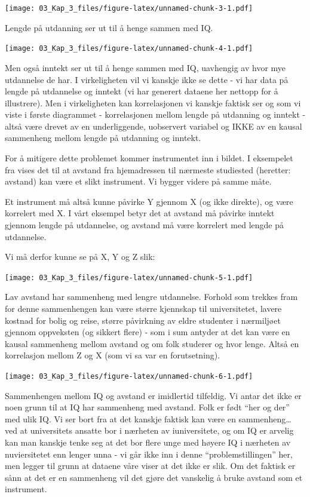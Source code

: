 \documentclass[
]{article}
\begin{document}
\texttt{[image: 03\_Kap\_3\_files/figure-latex/unnamed-chunk-3-1.pdf]}

Lengde på utdanning ser ut til å henge sammen med IQ.

\texttt{[image: 03\_Kap\_3\_files/figure-latex/unnamed-chunk-4-1.pdf]}

Men også inntekt ser ut til å henge sammen med IQ, uavhengig av hvor mye utdannelse de har. I virkeligheten vil vi kanskje ikke se dette - vi har data på lengde på utdannelse og inntekt (vi har generert dataene her nettopp for å illustrere). Men i virkeligheten kan korrelasjonen vi kanskje faktisk ser og som vi viste i første diagrammet - korrelasjonen mellom lengde på utdanning og inntekt - altså være drevet av en underliggende, uobservert variabel og IKKE av en kausal sammenheng mellom lengde på utdanning og inntekt.

For å mitigere dette problemet kommer instrumentet inn i bildet. I eksempelet fra \citet{mastenCausalInferenceBootcamp2015} vises det til at avstand fra hjemadressen til nærmeste studiested (heretter: avstand) kan være et slikt instrument. Vi bygger videre på samme måte.

Et instrument må altså kunne påvirke Y gjennom X (og ikke direkte), og være korrelert med X. I vårt eksempel betyr det at avstand må påvirke inntekt gjennom lengde på utdannelse, og avstand må være korrelert med lengde på utdannelse.

Vi må derfor kunne se på X, Y og Z slik:

\texttt{[image: 03\_Kap\_3\_files/figure-latex/unnamed-chunk-5-1.pdf]}

Lav avstand har sammenheng med lengre utdannelse. Forhold som trekkes fram for denne sammenhengen kan være større kjennskap til universitetet, lavere kostnad for bolig og reise, større påvirkning av eldre studenter i nærmiljøet gjennom oppveksten (og sikkert flere) - som i sum antyder at det kan være en kausal sammenheng mellom avstand og om folk studerer og hvor lenge. Altså en korrelasjon mellom Z og X (som vi sa var en forutsetning).

\texttt{[image: 03\_Kap\_3\_files/figure-latex/unnamed-chunk-6-1.pdf]}

Sammenhengen mellom IQ og avstand er imidlertid tilfeldig. Vi antar det ikke er noen grunn til at IQ har sammenheng med avstand. Folk er født ``her og der'' med ulik IQ. Vi ser bort fra at det kanskje faktisk kan være en sammenheng\ldots{} ved at universitets ansatte bor i nærheten av iuniversitete, og om IQ er arvelig kan man kanskje tenke seg at det bor flere unge med høyere IQ i nærheten av nuviersitetet enn lenger unna - vi går ikke inn i denne ``problemstillingen'' her, men legger til grunn at dataene våre viser at det ikke er slik. Om det faktisk er sånn at det er en sammenheng vil det gjøre det vanskelig å bruke avstand som et instrument.
\end{document}
